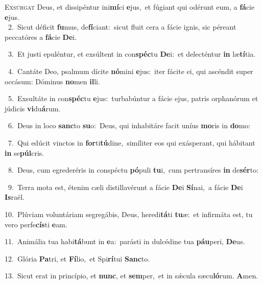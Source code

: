 \lettrine{\initial\textcolor{\initialcolor}{E}}{xsúrgat} Deus, et dissipéntur ini\-\textbf{mí}\-ci \textbf{e}\-jus,~\star et fúgiant qui odérunt eum, a \textbf{fá}\-cie \textbf{e}\-jus.\\
{\numbfont\textcolor{\numbcolor}{~2.}}~Sicut déficit \textbf{fu}\-mus, de\-\textbf{fí}\-ciant:~\star sicut fluit cera a fácie ignis, sic péreant peccatóres a \textbf{fá}\-cie \textbf{De}\-i.\par
{\numbfont\textcolor{\numbcolor}{~3.}}~Et justi epuléntur, et exsúltent in con\-\textbf{spéc}\-tu \textbf{De}\-i:~\star et delecténtur \textbf{in} læ\-\textbf{tí}\-tia.\par
{\numbfont\textcolor{\numbcolor}{~4.}}~Cantáte Deo, psalmum dícite \textbf{nó}\-mini \textbf{e}\-jus:~\star iter fácite ei, qui ascéndit super occásum: Dóminus \textbf{no}\-men \textbf{il}\-li.\par
{\numbfont\textcolor{\numbcolor}{~5.}}~Exsultáte in con\-\textbf{spéc}\-tu \textbf{e}\-jus:~\star turbabúntur a fácie ejus, patris orphanórum et júdicis \textbf{vi}\-du\-\textbf{á}\-rum.\par
{\numbfont\textcolor{\numbcolor}{~6.}}~Deus in loco \textbf{sanc}\-to \textbf{su}\-o:~\star Deus, qui inhabitáre facit uníus \textbf{mo}\-ris in \textbf{do}\-mo:\par
{\numbfont\textcolor{\numbcolor}{~7.}}~Qui edúcit vinctos in \textbf{for}\-ti\-\textbf{tú}\-dine,~\star simíliter eos qui exásperant, qui hábitant \textbf{in} se\-\textbf{púl}\-cris.\par
{\numbfont\textcolor{\numbcolor}{~8.}}~Deus, cum egrederéris in conspéctu \textbf{pó}\-puli \textbf{tu}\-i,~\star cum pertransíres \textbf{in} de\-\textbf{sér}\-to:\par
{\numbfont\textcolor{\numbcolor}{~9.}}~Terra mota est, étenim cæli distillavérunt a fácie \textbf{De}\-i \textbf{Sí}\-nai,~\star a fácie \textbf{De}\-i \textbf{Is}\-raël.\par
{\numbfont\textcolor{\numbcolor}{10.}}~Plúviam voluntáriam segregábis, Deus, heredi\-\textbf{tá}\-ti \textbf{tu}\-æ:~\star et infirmáta est, tu vero perfe\-\textbf{cís}\-ti \textbf{e}\-am.\par
{\numbfont\textcolor{\numbcolor}{11.}}~Animália tua habi\-\textbf{tá}\-bunt in \textbf{e}\-a:~\star parásti in dulcédine tua \textbf{páu}\-peri, \textbf{De}\-us.\par
{\numbfont\textcolor{\numbcolor}{12.}}~Glória \textbf{Pa}\-tri, et \textbf{Fí}\-lio,~\star et Spi\-\textbf{rí}\-tui \textbf{Sanc}\-to.\par
{\numbfont\textcolor{\numbcolor}{13.}}~Sicut erat in princípio, et \textbf{nunc}\-, et \textbf{sem}\-per,~\star et in sǽcula sæcu\-\textbf{ló}\-rum. \textbf{A}\-men.\par
